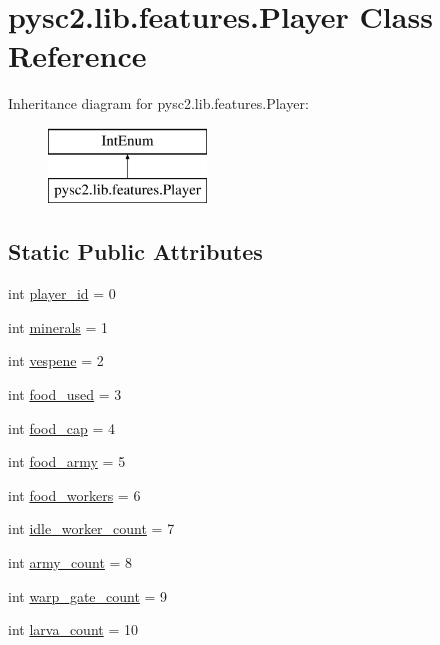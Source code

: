 \hypertarget{classpysc2_1_1lib_1_1features_1_1_player}{}\section{pysc2.\+lib.\+features.\+Player Class Reference}
\label{classpysc2_1_1lib_1_1features_1_1_player}
Inheritance diagram for pysc2.\+lib.\+features.\+Player\+:\begin{figure}[H]
\begin{center}
\leavevmode
\includegraphics[height=2.000000cm]{classpysc2_1_1lib_1_1features_1_1_player}
\end{center}
\end{figure}
\subsection*{Static Public Attributes}
\begin{DoxyCompactItemize}
\item 
int \mbox{\hyperlink{classpysc2_1_1lib_1_1features_1_1_player_a3ec243ede3dacff2d874db1a3611449e}{player\+\_\+id}} = 0
\item 
int \mbox{\hyperlink{classpysc2_1_1lib_1_1features_1_1_player_ac8d94400c53eb95adf137c33fc293d0c}{minerals}} = 1
\item 
int \mbox{\hyperlink{classpysc2_1_1lib_1_1features_1_1_player_ab8f544b7f7c23b9a60a14f63e54111b1}{vespene}} = 2
\item 
int \mbox{\hyperlink{classpysc2_1_1lib_1_1features_1_1_player_aaf9dc471b0d72a4db1175386080c5d59}{food\+\_\+used}} = 3
\item 
int \mbox{\hyperlink{classpysc2_1_1lib_1_1features_1_1_player_a5f18d1fa21b8a7af057098c011934730}{food\+\_\+cap}} = 4
\item 
int \mbox{\hyperlink{classpysc2_1_1lib_1_1features_1_1_player_aee6061e2e25930f8c1a6f25076c1fa89}{food\+\_\+army}} = 5
\item 
int \mbox{\hyperlink{classpysc2_1_1lib_1_1features_1_1_player_a3c1dc3dc499af96710bf96af26091ade}{food\+\_\+workers}} = 6
\item 
int \mbox{\hyperlink{classpysc2_1_1lib_1_1features_1_1_player_a37cd0b61091681d309c1c0e062df4c88}{idle\+\_\+worker\+\_\+count}} = 7
\item 
int \mbox{\hyperlink{classpysc2_1_1lib_1_1features_1_1_player_ad00f2e5e5106025d21e666ed3bd0f716}{army\+\_\+count}} = 8
\item 
int \mbox{\hyperlink{classpysc2_1_1lib_1_1features_1_1_player_a15a1f28e1f09c5fdfb6cb322ff5b16e0}{warp\+\_\+gate\+\_\+count}} = 9
\item 
int \mbox{\hyperlink{classpysc2_1_1lib_1_1features_1_1_player_a8cdae01d73f99de36f7e5a8b946816a3}{larva\+\_\+count}} = 10
\end{DoxyCompactItemize}


